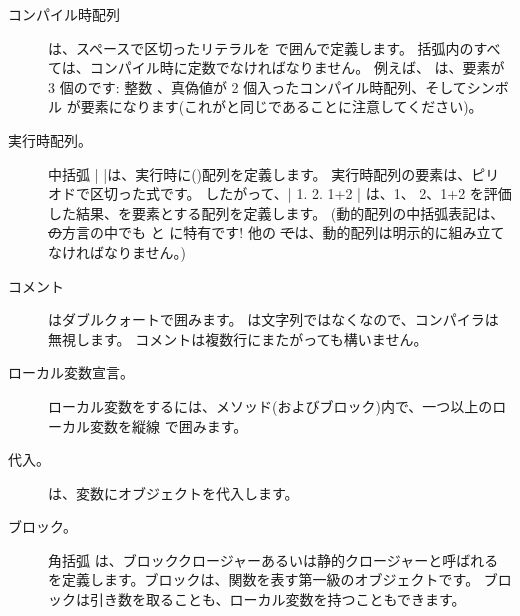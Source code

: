 \documentclass[a4paper,10pt,twoside]{book}
\begin{document}
\begin{description}
\item[コンパイル時配列] は、スペースで区切ったリテラルを \ct{#( )} で囲んで定義します。
		括弧内のすべては、コンパイル時に定数でなければなりません。
		例えば、 は、要素が 3 個のです: 整数 、真偽値が 2 個入ったコンパイル時配列、そしてシンボル  が要素になります(これがと同じであることに注意してください)。

\item[実行時配列。] 中括弧 \ct|{ }|は、実行時に()配列を定義します。
		実行時配列の要素は、ピリオドで区切った式です。
		したがって、\ct|{ 1. 2. 1+2 }| は、1、 2、1+2 を評価した結果、を要素とする配列を定義します。
		(動的配列の中括弧表記は、\st の方言の中でも \pharo と \squeak に特有です!
		他の \st では、動的配列は明示的に組み立てなければなりません。)

\item[コメント] はダブルクォートで囲みます。
		 は文字列ではなくなので、\pharo コンパイラは無視します。
		コメントは複数行にまたがっても構いません。
		
\item[ローカル変数宣言。] ローカル変数をするには、メソッド(およびブロック)内で、一つ以上のローカル変数を縦線 \ct{| |} で囲みます。

\item[代入。] \ct{:=} は、変数にオブジェクトを代入します。

\item[ブロック。] 角括弧 \ct{[ ]} は、ブロッククロージャーあるいは静的クロージャーと呼ばれるを定義します。ブロックは、関数を表す第一級のオブジェクトです。
		ブロックは引き数を取ることも、ローカル変数を持つこともできます。


\end{description}
\end{document}

